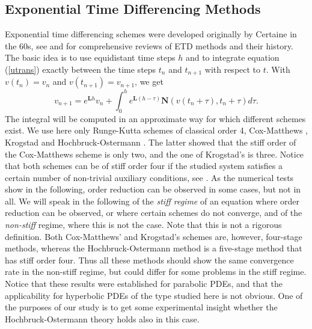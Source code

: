 \documentclass[final]{siamltex}
\begin{document}
\subsection{Exponential Time Differencing Methods}

Exponential time differencing schemes were developed originally by 
Certaine \cite{Cer} in the 60s,  see 
\cite{MW} and \cite{HO09} for comprehensive 
reviews of ETD methods and their  history. The basic idea is to use equidistant time 
steps $h$ and to integrate equation (\ref{utrans}) exactly between 
the time steps $t_{n}$ and $t_{n+1}$ with respect to $t$. With $v(t_{n}) = v_{n}$ and 
$v(t_{n+1})=v_{n+1}$, we get 
$$
v_{n+1}=e^{\mathbf{L}h}v_{n}+\int_{0}^{h} e^{\mathbf{L}(h-\tau)}
    \mathbf{N}(v(t_{n}+\tau),t_{n}+\tau)d\tau.
$$
The integral will be computed in an approximate way for which 
different schemes exist. We use here only  
Runge-Kutta schemes of classical order 4,  Cox-Matthews 
\cite{CM}, Krogstad \cite{K} and  Hochbruck-Ostermann  \cite{HO}. 
The latter showed that the stiff order of 
the Cox-Matthews scheme is only two, and the one of Krogstad's is 
three. Notice that both schemes can be of stiff order four if the 
studied system satisfies a certain number of non-trivial auxiliary conditions, see 
\cite{HO}. As the numerical 
tests show in the following, order reduction can be observed in some 
cases, but not in all. We will speak in the following of the 
\emph{stiff regime} of an equation where order reduction can be 
observed, or where certain schemes do not converge, and of the 
\emph{non-stiff} regime, where this is not the case. Note that this 
is not a rigorous definition. Both Cox-Matthews' and Krogstad's schemes
are, however, four-stage methods, whereas the 
Hochbruck-Ostermann method  is a five-stage method that has stiff order 
four. Thus all these methods should show the same convergence rate in 
the non-stiff regime, but could differ for some problems in the stiff regime. Notice that 
these results \cite{HO} were established for parabolic PDEs, and that 
the applicability for hyperbolic PDEs of the type studied here is 
not obvious. One of the purposes of our study is to get some 
experimental insight whether the Hochbruck-Ostermann theory holds 
also in this case. 
\end{document}
